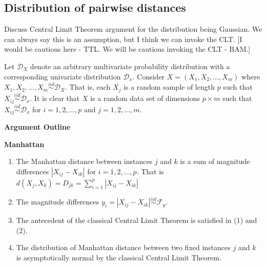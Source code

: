 \documentclass[10pt,letterpaper]{article}\usepackage[]{graphicx}\usepackage[]{color}
\begin{document}
\subsection{Distribution of pairwise distances}
Discuss Central Limit Theorem argument for the distribution being Gaussian. We can always say this is an assumption, but I think we can invoke the CLT. [I would be cautious here - TTL. We will be cautious invoking the CLT - BAM.]

Let $\mathcal{D}_X$ denote an arbitrary multivariate probability distribution with a corresponding univariate distribution $\mathcal{D}_x$. Consider $X = (X_1,X_2,\dots,X_m)$ where $X_1,X_2,\dots,X_m \overset{iid}{\sim} \mathcal{D}_X$. That is, each $X_j$ is a random sample of length $p$ such that $X_{ij} \overset{iid}{\sim} \mathcal{D}_x$. It is clear that $X$ is a random data set of dimensions $p \times m$ such that $X_{ij} \overset{iid}{\sim} \mathcal{D}_x$ for $i=1,2,\dots,p$ and $j=1,2,\dots,m$.

\begin{center}
\textbf{Argument Outline}
\end{center}

\noindent \textbf{Manhattan}
\begin{enumerate}
\item The Manhattan distance between instances $j$ and $k$ is a sum of magnitude differences $|X_{ij}-X_{ik}|$ for $i=1,2,\dots,p$. That is $d(X_j,X_k)=D_{jk} = \displaystyle \sum_{i=1}^{p}|X_{ij}-X_{ik}|$
\item The magnitude differences $y_i = |X_{ij} - X_{ik}| \overset{iid}{\sim} \mathcal{F}_y$.
\item The antecedent of the classical Central Limit Theorem is satisfied in (1) and (2).
\item The distribution of Manhattan distance between two fixed instances $j$ and $k$ is asymptotically normal by the classical Central Limit Theorem.
\end{enumerate}
\end{document}
